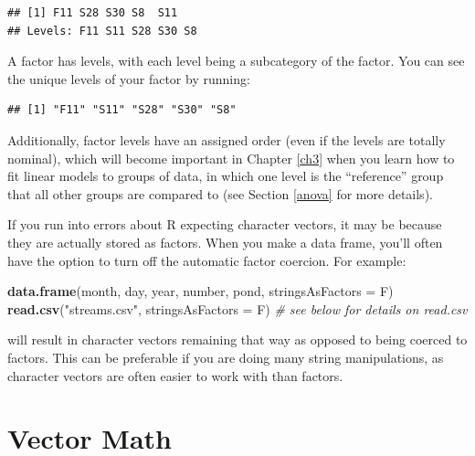 \documentclass[]{book}
\newenvironment{Shaded}{\begin{snugshade}}{\end{snugshade}}
\newcommand{\KeywordTok}[1]{\textcolor[rgb]{0.13,0.29,0.53}{\textbf{#1}}}
\newcommand{\DataTypeTok}[1]{\textcolor[rgb]{0.13,0.29,0.53}{#1}}
\newcommand{\StringTok}[1]{\textcolor[rgb]{0.31,0.60,0.02}{#1}}
\newcommand{\CommentTok}[1]{\textcolor[rgb]{0.56,0.35,0.01}{\textit{#1}}}
\newcommand{\OperatorTok}[1]{\textcolor[rgb]{0.81,0.36,0.00}{\textbf{#1}}}
\newcommand{\NormalTok}[1]{#1}
\theoremstyle{definition}
\theoremstyle{definition}
\theoremstyle{definition}
\theoremstyle{remark}
\begin{document}
\begin{verbatim}
## [1] F11 S28 S30 S8  S11
## Levels: F11 S11 S28 S30 S8
\end{verbatim}

A factor has levels, with each level being a subcategory of the factor.
You can see the unique levels of your factor by running:

\begin{Shaded}
\end{Shaded}

\begin{verbatim}
## [1] "F11" "S11" "S28" "S30" "S8"
\end{verbatim}

Additionally, factor levels have an assigned order (even if the levels
are totally nominal), which will become important in Chapter \ref{ch3}
when you learn how to fit linear models to groups of data, in which one
level is the ``reference'' group that all other groups are compared to
(see Section \ref{anova} for more details).

If you run into errors about R expecting character vectors, it may be
because they are actually stored as factors. When you make a data frame,
you'll often have the option to turn off the automatic factor coercion.
For example:

\begin{Shaded}
\begin{Highlighting}[]
\KeywordTok{data.frame}\NormalTok{(month, day, year, number, pond, }\DataTypeTok{stringsAsFactors =}\NormalTok{ F)}
\KeywordTok{read.csv}\NormalTok{(}\StringTok{"streams.csv"}\NormalTok{, }\DataTypeTok{stringsAsFactors =}\NormalTok{ F)  }\CommentTok{# see below for details on read.csv}
\end{Highlighting}
\end{Shaded}

will result in character vectors remaining that way as opposed to being
coerced to factors. This can be preferable if you are doing many string
manipulations, as character vectors are often easier to work with than
factors.

\section{Vector Math}\label{vector-math}
\end{document}
